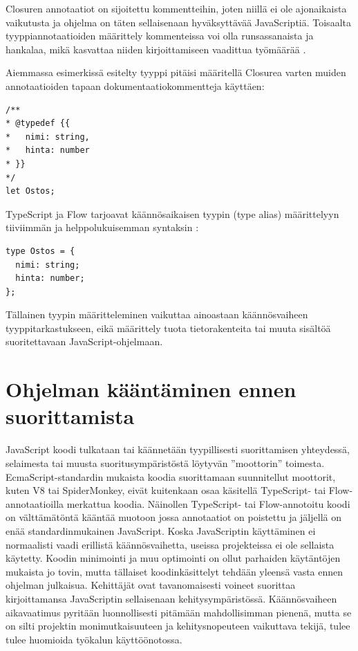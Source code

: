 Closuren annotaatiot on sijoitettu kommentteihin, joten niillä ei ole
ajonaikaista vaikutusta ja ohjelma on täten sellaisenaan hyväksyttävää
JavaScriptiä. Toisaalta tyyppiannotaatioiden määrittely kommenteissa voi
olla runsassanaista ja hankalaa, mikä kasvattaa niiden kirjoittamiseen vaadittua
työmäärää \cite{TypeScriptSpec, TypeScriptatBuild}.

\begin{minipage}{\linewidth}
Aiemmassa esimerkissä esitelty tyyppi  pitäisi
määritellä Closurea varten muiden annotaatioiden tapaan dokumentaatiokommentteja käyttäen:
\begin{lstlisting}[label={lst:closure_typedef}]
/**
* @typedef {{
*   nimi: string,
*   hinta: number
* }}
*/
let Ostos;
\end{lstlisting}
\end{minipage}

TypeScript ja Flow tarjoavat käännösaikaisen tyypin (type alias)
määrittelyyn tiiviimmän ja helppolukuisemman syntaksin \cite{TypeScriptSpec}:

\begin{minipage}{\linewidth}
\begin{lstlisting}[label={lst:ts_flow_type_alias}]
type Ostos = {
  nimi: string;
  hinta: number;
};
\end{lstlisting}
\end{minipage}
Tällainen tyypin määritteleminen vaikuttaa ainoastaan käännösvaiheen
tyyppitarkastukseen, eikä määrittely tuota tietorakenteita tai muuta
sisältöä suoritettavaan JavaScript-ohjelmaan.

\section{Ohjelman kääntäminen ennen suorittamista}

JavaScript koodi tulkataan tai käännetään tyypillisesti suorittamisen
yhteydessä, selaimesta tai muusta suoritusympäristöstä löytyvän ”moottorin”
toimesta. EcmaScript-standardin mukaista koodia suorittamaan suunnitellut
moottorit, kuten V8 tai SpiderMonkey, eivät kuitenkaan osaa käsitellä
TypeScript- tai Flow-annotaatioilla merkattua koodia. Näinollen TypeScript-
tai Flow-annotoitu koodi on välttämätöntä kääntää muotoon jossa
annotaatiot on poistettu ja jäljellä on enää standardinmukainen JavaScript.
Koska JavaScriptin käyttäminen ei normaalisti vaadi erillistä
käännösvaihetta, useissa projekteissa ei ole sellaista käytetty. Koodin
minimointi ja muu optimointi on ollut parhaiden käytäntöjen mukaista jo
tovin, mutta tällaiset koodinkäsittelyt tehdään yleensä vasta ennen ohjelman
julkaisua. Kehittäjät ovat tavanomaisesti voineet suorittaa kirjoittamansa
JavaScriptin sellaisenaan kehitysympäristössä. Käännösvaiheen aikavaatimus
pyritään luonnollisesti pitämään mahdollisimman pienenä, mutta se on silti
projektin monimutkaisuuteen ja kehitysnopeuteen vaikuttava tekijä, tulee
tulee huomioida työkalun käyttöönotossa.

